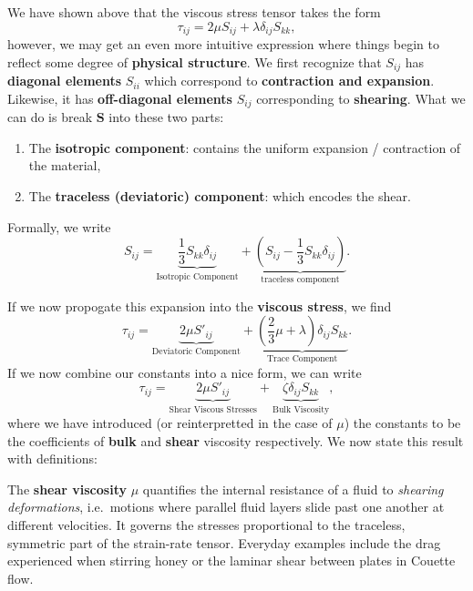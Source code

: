 We have shown above that the viscous stress tensor takes the form
\[
\tau_{ij} = 2\mu S_{ij} + \lambda \delta_{ij} S_{kk},
\]
however, we may get an even more intuitive expression where things begin to reflect some degree of \textbf{physical structure}. We first recognize that $S_{ij}$ has \textbf{diagonal elements } $S_{ii}$ which correspond to \textbf{contraction and expansion}. Likewise, it has \textbf{off-diagonal elements} $S_{ij}$ corresponding to \textbf{shearing}. What we can do is break $\boldsymbol{S}$ into these two parts:
\vspace{0.25cm}
\begin{enumerate}
    \item The \textbf{isotropic component}: contains the uniform expansion / contraction of the material,
    \item The \textbf{traceless (deviatoric) component}: which encodes the shear.
\end{enumerate}
\vspace{0.25cm}
Formally, we write
\[
S_{ij} = \underbrace{\frac{1}{3} S_{kk} \delta_{ij}}_{\text{Isotropic Component}} + \underbrace{\left(S_{ij} - \frac{1}{3} S_{kk}\delta_{ij}\right)}_{\text{traceless component}}.
\]
\par
If we now propogate this expansion into the \textbf{viscous stress}, we find
\begin{equation}
    \tau_{ij} = \underbrace{2\mu S'_{ij}}_{\text{Deviatoric Component}} + \underbrace{\left(\frac{2}{3}\mu + \lambda\right)\delta_{ij} S_{kk}}_{\text{Trace Component}}.
\end{equation}
If we now combine our constants into a nice form, we can write
\begin{equation}
    \label{eq:viscous_stress_tensor}
    \boxed{
    \tau_{ij} = \underbrace{2\mu S'_{ij}}_{\text{Shear Viscous Stresses}} + \underbrace{\zeta \delta_{ij} S_{kk}}_{\text{Bulk Viscosity}},
    }
\end{equation}
where we have introduced (or reinterpretted in the case of $\mu$) the constants to be the coefficients of \textbf{bulk} and \textbf{shear} viscosity respectively. We now state this result with definitions:
\vspace{0.5cm}
\begin{definition}\label{def:shear-viscosity}
The \textbf{shear viscosity} $\mu$ quantifies the internal resistance of a fluid to \emph{shearing deformations}, i.e.~motions where parallel fluid layers slide past one another at different velocities. It governs the stresses proportional to the traceless, symmetric part of the strain-rate tensor. Everyday examples include the drag experienced when stirring honey or the laminar shear between plates in Couette flow.
\end{definition}


